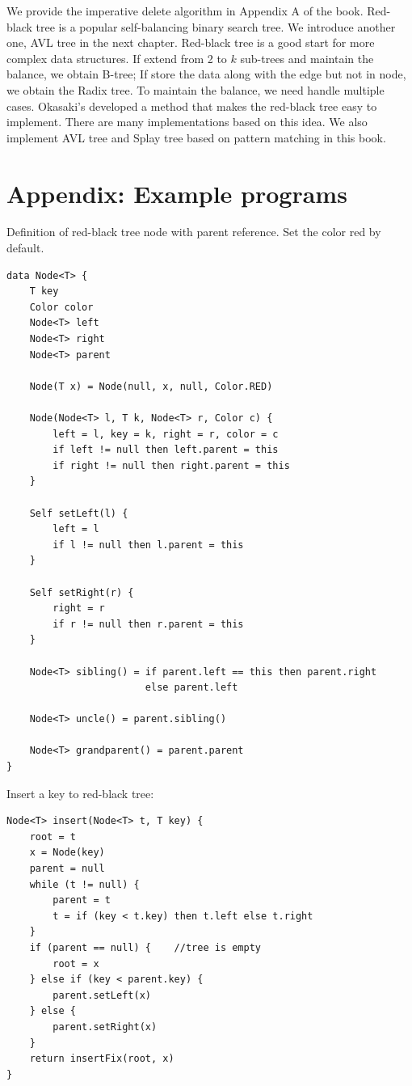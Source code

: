\documentclass[b5paper]{article}
\begin{document}
We provide the imperative delete algorithm in Appendix A of the book. Red-black tree is a popular self-balancing binary search tree. We introduce another one, AVL tree in the next chapter. Red-black tree is a good start for more complex data structures. If extend from 2 to $k$ sub-trees and maintain the balance, we obtain B-tree; If store the data along with the edge but not in node, we obtain the Radix tree. To maintain the balance, we need handle multiple cases. Okasaki's developed a method that makes the red-black tree easy to implement. There are many implementations based on this idea\cite{rosetta}. We also implement AVL tree and Splay tree based on pattern matching in this book.

\section{Appendix: Example programs}

Definition of red-black tree node with parent reference. Set the color red by default.

\begin{lstlisting}[language = Bourbaki]
data Node<T> {
    T key
    Color color
    Node<T> left
    Node<T> right
    Node<T> parent

    Node(T x) = Node(null, x, null, Color.RED)

    Node(Node<T> l, T k, Node<T> r, Color c) {
        left = l, key = k, right = r, color = c
        if left != null then left.parent = this
        if right != null then right.parent = this
    }

    Self setLeft(l) {
        left = l
        if l != null then l.parent = this
    }

    Self setRight(r) {
        right = r
        if r != null then r.parent = this
    }

    Node<T> sibling() = if parent.left == this then parent.right
                        else parent.left

    Node<T> uncle() = parent.sibling()

    Node<T> grandparent() = parent.parent
}
\end{lstlisting}

Insert a key to red-black tree:

\begin{lstlisting}[language = Bourbaki]
Node<T> insert(Node<T> t, T key) {
    root = t
    x = Node(key)
    parent = null
    while (t != null) {
        parent = t
        t = if (key < t.key) then t.left else t.right
    }
    if (parent == null) {    //tree is empty
        root = x
    } else if (key < parent.key) {
        parent.setLeft(x)
    } else {
        parent.setRight(x)
    }
    return insertFix(root, x)
}
\end{lstlisting}
\end{document}
